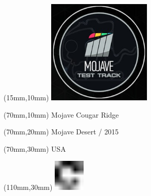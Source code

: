 \null\newpage
\begin{textblock*}{50mm}(15mm,10mm)%
\includegraphics[width=50mm]{LG/MOJA.png}
\end{textblock*}
\begin{textblock*}{130mm}(70mm,10mm)%
{\fontsize{20}{20}\selectfont Mojave Cougar Ridge}\\
\end{textblock*}
\begin{textblock*}{120mm}(70mm,20mm)%
{\fontsize{16}{16}\selectfont Mojave Desert / 2015}\\
\end{textblock*}
\begin{textblock*}{120mm}(70mm,30mm)%
{\fontsize{12}{12}\selectfont USA}
\end{textblock*}
\begin{textblock*}{30mm}(110mm,30mm)%
\centering
\includegraphics[height=15mm]{icons/fa-rotate-right.pdf}
\end{textblock*}
